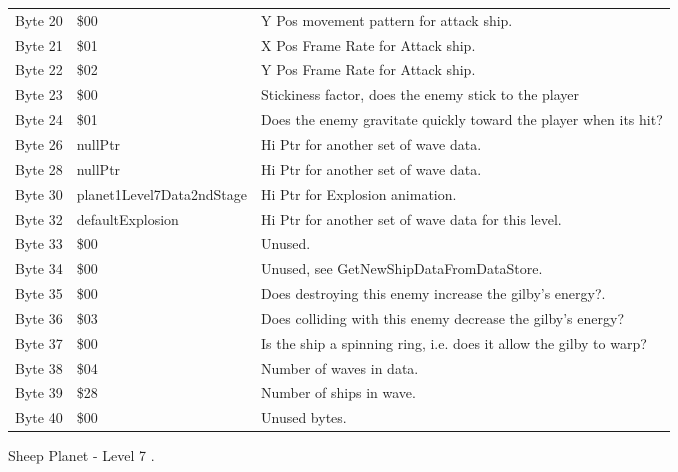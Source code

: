 \begin{figure}[H]
{\begin{adjustbox}{width=12cm}
\begin{tabular}{lll}
 Byte 20 & \$00                       & Y Pos movement pattern for attack ship.                            \\
 Byte 21 & \$01                       & X Pos Frame Rate for Attack ship.                                  \\
 Byte 22 & \$02                       & Y Pos Frame Rate for Attack ship.                                  \\
 Byte 23 & \$00                       & Stickiness factor, does the enemy stick to the player              \\
 Byte 24 & \$01                       & Does the enemy gravitate quickly toward the player when its hit?   \\
 Byte 26 & nullPtr                   & Hi Ptr for another set of wave data.                               \\
 Byte 28 & nullPtr                   & Hi Ptr for another set of wave data.                               \\
 Byte 30 & planet1Level7Data2ndStage & Hi Ptr for Explosion animation.                                    \\
 Byte 32 & defaultExplosion          & Hi Ptr for another set of wave data for this level.                \\
 Byte 33 & \$00                       & Unused.                                                            \\
 Byte 34 & \$00                       & Unused, see GetNewShipDataFromDataStore.                           \\
 Byte 35 & \$00                       & Does destroying this enemy increase the gilby's energy?.           \\
 Byte 36 & \$03                       & Does colliding with this enemy decrease the gilby's energy?        \\
 Byte 37 & \$00                       & Is the ship a spinning ring, i.e. does it allow the gilby to warp? \\
 Byte 38 & \$04                       & Number of waves in data.                                           \\
 Byte 39 & \$28                       & Number of ships in wave.                                           \\
 Byte 40 & \$00                       & Unused bytes.                                                      \\
\bottomrule
\end{tabular}

  \end{adjustbox}

  }\caption*{Sheep Planet - Level 7
.}
\end{figure}

